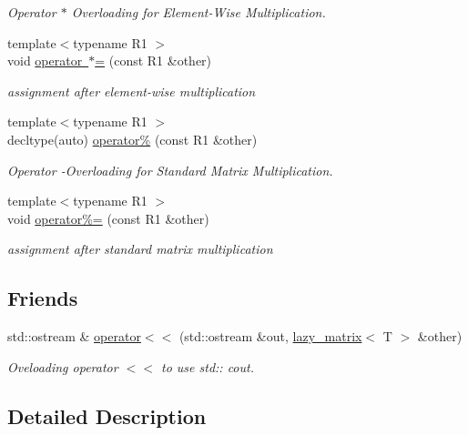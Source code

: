 \begin{DoxyCompactItemize}
\begin{DoxyCompactList}\small\item\em Operator $\ast$ Overloading for Element-\/\+Wise Multiplication. \end{DoxyCompactList}\item 
{\footnotesize template$<$typename R1 $>$ }\\void \mbox{\hyperlink{classlazy__matrix_a4299662cd5c146c7fd9b92cccf90467c}{operator $\ast$=}} (const R1 \&other)
\begin{DoxyCompactList}\small\item\em assignment after element-\/wise multiplication \end{DoxyCompactList}\item 
{\footnotesize template$<$typename R1 $>$ }\\decltype(auto) \mbox{\hyperlink{classlazy__matrix_ad6086869ba1a16b7995804e8f3d53aff}{operator\%}} (const R1 \&other)
\begin{DoxyCompactList}\small\item\em Operator -\/Overloading for Standard Matrix Multiplication. \end{DoxyCompactList}\item 
{\footnotesize template$<$typename R1 $>$ }\\void \mbox{\hyperlink{classlazy__matrix_a6bf0976366215515282bea034b863489}{operator\%=}} (const R1 \&other)
\begin{DoxyCompactList}\small\item\em assignment after standard matrix multiplication \end{DoxyCompactList}\end{DoxyCompactItemize}
\subsection*{Friends}
\begin{DoxyCompactItemize}
\item 
std\+::ostream \& \mbox{\hyperlink{classlazy__matrix_a2840b44da6b181bb3dfbdf8ffd104fec}{operator$<$$<$}} (std\+::ostream \&out, \mbox{\hyperlink{classlazy__matrix}{lazy\+\_\+matrix}}$<$ T $>$ \&other)
\begin{DoxyCompactList}\small\item\em Oveloading operator $<$$<$ to use std\+:\+: cout. \end{DoxyCompactList}\end{DoxyCompactItemize}


\subsection{Detailed Description}
